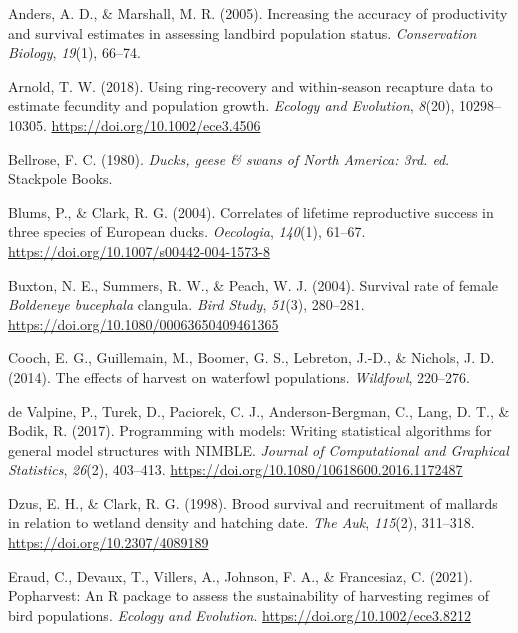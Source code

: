 \documentclass[
  english,
]{article}
\newlength{\cslhangindent}
\newlength{\cslentryspacingunit} %
\newenvironment{CSLReferences}[2] %
 {%
  \setlength{\parindent}{0pt}
  \ifodd #1
  \let\oldpar\par
  \def\par{\hangindent=\cslhangindent\oldpar}
  \fi
  \setlength{\parskip}{#2\cslentryspacingunit}
 }%
 {}
\begin{document}
\hypertarget{refs}{}
\begin{CSLReferences}{1}{0}
\leavevmode{}%
Anders, A. D., \& Marshall, M. R. (2005). Increasing the accuracy of productivity and survival estimates in assessing landbird population status. \emph{Conservation Biology}, \emph{19}(1), 66--74.

\leavevmode{}%
Arnold, T. W. (2018). Using ring-recovery and within-season recapture data to estimate fecundity and population growth. \emph{Ecology and Evolution}, \emph{8}(20), 10298--10305. \url{https://doi.org/10.1002/ece3.4506}

\leavevmode{}%
Bellrose, F. C. (1980). \emph{Ducks, geese \& swans of {N}orth {A}merica: 3rd. ed}. Stackpole Books.

\leavevmode{}%
Blums, P., \& Clark, R. G. (2004). Correlates of lifetime reproductive success in three species of {E}uropean ducks. \emph{Oecologia}, \emph{140}(1), 61--67. \url{https://doi.org/10.1007/s00442-004-1573-8}

\leavevmode{}%
Buxton, N. E., Summers, R. W., \& Peach, W. J. (2004). Survival rate of female \emph{{B}oldeneye bucephala} clangula. \emph{Bird Study}, \emph{51}(3), 280--281. \url{https://doi.org/10.1080/00063650409461365}

\leavevmode{}%
Cooch, E. G., Guillemain, M., Boomer, G. S., Lebreton, J.-D., \& Nichols, J. D. (2014). The effects of harvest on waterfowl populations. \emph{Wildfowl}, 220--276.

\leavevmode{}%
de Valpine, P., Turek, D., Paciorek, C. J., Anderson-Bergman, C., Lang, D. T., \& Bodik, R. (2017). Programming with models: Writing statistical algorithms for general model structures with {NIMBLE}. \emph{Journal of Computational and Graphical Statistics}, \emph{26}(2), 403--413. \url{https://doi.org/10.1080/10618600.2016.1172487}

\leavevmode{}%
Dzus, E. H., \& Clark, R. G. (1998). Brood survival and recruitment of mallards in relation to wetland density and hatching date. \emph{The Auk}, \emph{115}(2), 311--318. \url{https://doi.org/10.2307/4089189}

\leavevmode{}%
Eraud, C., Devaux, T., Villers, A., Johnson, F. A., \& Francesiaz, C. (2021). Popharvest: An {R} package to assess the sustainability of harvesting regimes of bird populations. \emph{Ecology and Evolution}. \url{https://doi.org/10.1002/ece3.8212}


\end{CSLReferences}
\end{document}
